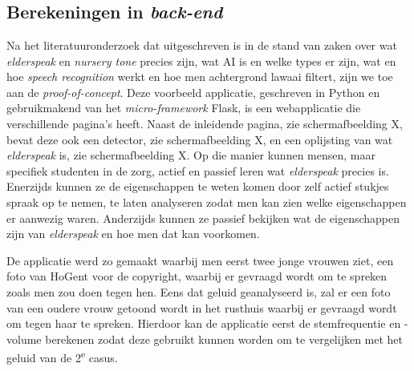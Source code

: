 
\chapter{}
\label{ch:methodologie}


\section{Berekeningen in \textit{back-end}}
Na het literatuuronderzoek dat uitgeschreven is in de stand van zaken over wat \textit{elderspeak} en \textit{nursery tone} precies zijn, wat AI is en welke types er zijn, wat en hoe \textit{speech recognition} werkt en hoe men achtergrond lawaai filtert, zijn we toe aan de \textit{proof-of-concept}. Deze voorbeeld applicatie, geschreven in Python en gebruikmakend van het \textit{micro-framework} Flask, is een webapplicatie die verschillende pagina’s heeft. Naast de inleidende pagina, zie schermafbeelding X, bevat deze ook een detector, zie schermafbeelding X, en een oplijsting van wat \textit{elderspeak} is, zie schermafbeelding X. Op die manier kunnen mensen, maar specifiek studenten in de zorg, actief en passief leren wat \textit{elderspeak} precies is. Enerzijds kunnen ze de eigenschappen te weten komen door zelf actief stukjes spraak op te nemen, te laten analyseren zodat men kan zien welke eigenschappen er aanwezig waren. Anderzijds kunnen ze passief bekijken wat de eigenschappen zijn van \textit{elderspeak} en hoe men dat kan voorkomen.

De applicatie werd zo gemaakt waarbij men eerst twee jonge vrouwen ziet, een foto van HoGent voor de copyright, waarbij er gevraagd wordt om te spreken zoals men zou doen tegen hen. Eens dat geluid geanalyseerd is, zal er een foto van een oudere vrouw getoond wordt in het rusthuis waarbij er gevraagd wordt om tegen haar te spreken. Hierdoor kan de applicatie eerst de stemfrequentie en -volume berekenen zodat deze gebruikt kunnen worden om te vergelijken met het geluid van de 2\textsuperscript{e} casus.

